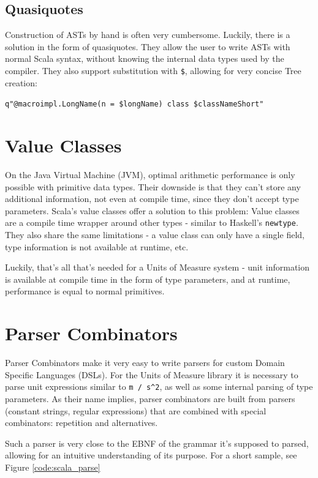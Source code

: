 \documentclass[12pt,oneside,a4paper]{scrbook}
\begin{document}
\subsection{Quasiquotes}
Construction of ASTs by hand is often very cumbersome. Luckily, there is a solution in the form of quasiquotes. They allow the user to write ASTs with normal Scala syntax, without knowing the internal data types used by the compiler. They also support substitution with \verb|$|, allowing for very concise Tree creation:

\verb|q"@macroimpl.LongName(n = $longName) class $classNameShort"|



\section{Value Classes}
\label{sec:value_classes}

On the Java Virtual Machine (JVM), optimal arithmetic performance is only possible with primitive data types. Their downside is that they can't store any additional information, not even at compile time, since they don't accept type parameters.
Scala's value classes offer a solution to this problem: Value classes are a compile time wrapper around other types - similar to Haskell's \verb|newtype|. They also share the same limitations - a value class can only have a single field, type information is not available at runtime, etc.

Luckily, that's all that's needed for a Units of Measure system - unit information is available at compile time in the form of type parameters, and at runtime, performance is equal to normal primitives.


\section{Parser Combinators}

Parser Combinators make it very easy to write parsers for custom Domain Specific Languages (DSLs). For the Units of Measure library it is necessary to parse unit expressions similar to \verb|m / s^2|, as well as some internal parsing of type parameters. As their name implies, parser combinators are built from parsers (constant strings, regular expressions) that are combined with special combinators: repetition and alternatives. \citep{Spiewak09}

Such a parser is very close to the EBNF of the grammar it's supposed to parsed, allowing for an intuitive understanding of its purpose. For a short sample, see Figure \ref{code:scala_parse}
\end{document}
